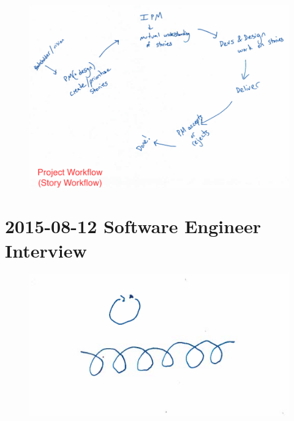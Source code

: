 \begin{figure}[h]
\centering
\includegraphics[width=6.5in]{interviews/drawings/2015_07_31b.png}
\caption{}
\end{figure}

\section{2015-08-12 Software Engineer Interview}

\begin{figure}[h]
\centering
\includegraphics[width=6.5in]{interviews/drawings/2015_08_12_se.png}
\caption{}
\end{figure}








